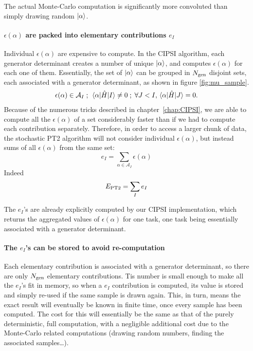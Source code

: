 \documentclass[./thesis.tex]{subfiles}
\begin{document}
The actual Monte-Carlo computation is significantly more convoluted than simply drawing random ${\ket{\alpha}}$.

\paragraph{$\epsilon(\alpha)$ are packed into elementary contributions $e_I$}
Individual $\epsilon(\alpha)$ are expensive to compute. In the CIPSI algorithm, each generator determinant creates a number of unique ${\ket{\alpha}}$, and computes $\epsilon(\alpha)$ for each one of them.
Essentially, the set of ${\ket{\alpha}}$ can be grouped in ${N_\text{gen}}$ disjoint sets, each associated with a generator determinant, as shown in figure \ref{fig:mu_sample}.
\begin{equation}
\epsilon(\alpha) \in \mathcal{A}_I \; ; \; \mel{\alpha}{\hat{H}}{I} \neq 0 \; ; \;   \forall J < I, \mel{\alpha}{\hat{H}}{J} = 0.
\end{equation}
Because of the numerous tricks described in chapter~\ref{chap:CIPSI}, we are able to compute all the $\epsilon(\alpha)$ of a set considerably faster than if we had to compute each contribution separately. Therefore, in order to access a larger chunk of data, the stochastic PT2 algorithm will not consider individual $\epsilon(\alpha)$, but instead sums of all $\epsilon(\alpha)$ from the same set:
\begin{equation}
e_I = \sum_{\alpha \in \mathcal{A}_I} \epsilon(\alpha)
\end{equation}
Indeed
\begin{equation}
E_\text{PT2} = \sum_{I} e_I
\end{equation}

The $e_I$'s are already explicitly computed by our CIPSI implementation, which returns the aggregated values of $\epsilon(\alpha)$ for one task, one task being essentially associated with a generator determinant.

\paragraph{The $e_I$'s can be stored to avoid re-computation}
Each elementary contribution is associated with a generator determinant, so there are only ${N_\text{gen}}$ elementary contributions. Tis number is small enough to make all the $e_I$'s fit in memory, so when a $e_I$ contribution is computed, its value is stored and simply re-used if the same sample is drawn again. This, in turn, means the exact result will eventually be known in finite time, once every sample has been computed. The cost for this will essentially be the same as that of the purely deterministic, full computation, with a negligible additional cost due to the Monte-Carlo related computations (drawing random numbers, finding the associated samples\dots).
\end{document}
